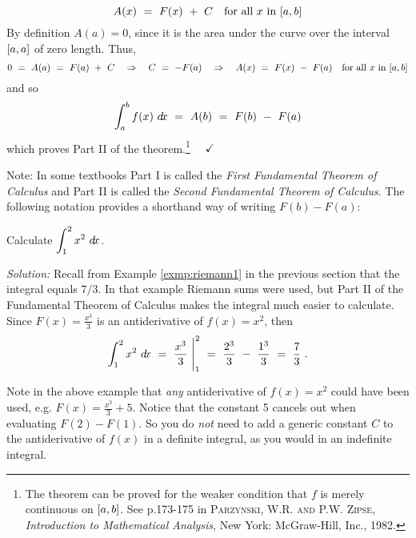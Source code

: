 \[
 A(x) ~=~ F(x) ~+~ C \quad\text{for all $x$ in $\lbrack a,b \rbrack$}
\]
\newpage
By definition $A(a) = 0$, since it is the area under the curve over the
interval $\lbrack a,a \rbrack$ of zero length. Thus,
\[
0 ~=~ A(a) ~=~ F(a) ~+~ C \quad\Rightarrow\quad C ~=~ -F(a)
\quad\Rightarrow\quad A(x) ~=~ F(x) ~-~ F(a)
\quad\text{for all $x$ in $\lbrack a,b \rbrack$}
\]
and so
\[
\int_a^b f(x)~d\!x ~=~ A(b) ~=~ F(b) ~-~ F(a)
\]
which proves Part II of the theorem.\footnote{The theorem can be proved for the
weaker condition that $f$ is merely continuous on $\lbrack a,b \rbrack$. See p.173-175
in \textsc{Parzynski, W.R. and P.W. Zipse}, \emph{Introduction to Mathematical
Analysis}, New York: McGraw-Hill, Inc., 1982.} $\quad\checkmark$

Note: In some textbooks Part I is called the \emph{First Fundamental Theorem of
Calculus} and Part II is called the \emph{Second Fundamental Theorem of
Calculus}. The following notation provides a shorthand way of writing
$F(b) - F(a)$:


\begin{exmp}\label{exmp:ftc1}
\noindent Calculate $\displaystyle\int_1^2 x^2~d\!x$.\vspace{1mm}
\par\noindent\emph{Solution:} Recall from Example \ref{exmp:riemann1} in the
previous section that the integral equals $7/3$. In that example Riemann sums
were used, but Part II of the Fundamental Theorem of Calculus makes the integral
much easier to calculate. Since $F(x) = \frac{x^3}{3}$ is an antiderivative of
$f(x) = x^2$, then
\[
\int_1^2 x^2~d\!x ~=~ \frac{x^3}{3}~\Biggr|_1^{2} ~=~ \frac{2^3}{3} ~-~ \frac{1^3}{3}
 ~=~ \frac{7}{3} ~.
\]
\end{exmp}
\divider
\vspace{3mm}

Note in the above example that \emph{any} antiderivative of $f(x)=x^2$ could
have been used, e.g. $F(x)= \frac{x^3}{3} + 5$. Notice that the constant 5
cancels out when evaluating $F(2)-F(1)$. So you do \emph{not}
need to add a generic constant $C$ to the antiderivative of $f(x)$ in a
definite integral, as you would in an indefinite integral.

